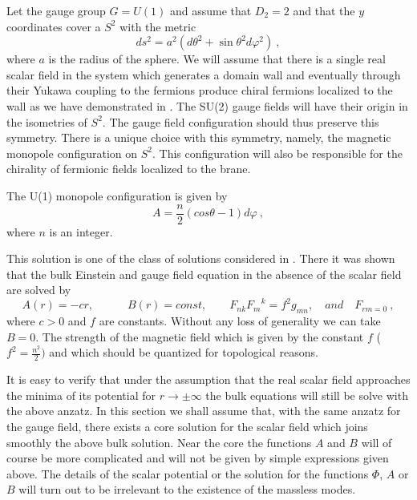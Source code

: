 \documentclass[a4paper,12pt]{article}
\begin{document}
Let the gauge group $G=U(1)$ and assume that $D_2=2$ and that the $y$
coordinates cover a $S^2$ with the metric
\begin{equation}
ds^2 = a^2 (d\theta^2  + \sin\theta ^2 d\varphi^2)~,
\end{equation}
where $a$ is the radius of the sphere.  We will assume that there is
a single real scalar field in the system which generates a domain
wall and eventually through their Yukawa coupling to the fermions
produce chiral fermions localized to the wall as we have demonstrated
in \cite{Randjbar-Daemi:2000cr}. The SU(2) gauge fields will have
their origin in the isometries of $S^2$. The gauge field
configuration should thus preserve this symmetry. There is a unique
choice with this symmetry, namely, the magnetic monopole
configuration on $S^2$. This configuration will also be responsible
for the chirality of fermionic fields localized to the brane.

The U(1) monopole configuration is given by
\begin{equation}
 A= \frac{n}{2}(cos\theta -1)d\varphi~,
\end{equation}
where $n$ is an integer.

This solution is one of the class of solutions considered in
\cite{Randjbar-Daemi:2000ft}. There it was shown that the bulk
Einstein and gauge field equation in the absence of the scalar field
are solved by
\begin{equation}
A(r) = -cr, \quad \quad\quad  B(r)=const, \quad\quad F_{nk}F_m^{\quad
k}= f^2 g_{mn}, \quad and\quad  F_{rm=0}~,
\end{equation}
where $c>0$ and $f$ are constants.  Without any loss of generality we
can take $B=0$. The strength of the magnetic field which is given by
the constant $f$  ( $f^2 = \frac{n^2}{2})$ and which should be
quantized for topological reasons.

It is easy to verify that under the assumption that the  real scalar
field approaches the minima of its potential for $r\rightarrow
\pm\infty$ the bulk equations will still  be solve with the above
anzatz.  In this section we shall assume that, with the same anzatz
for the gauge field,  there exists a core solution for the scalar
field which joins smoothly the above bulk solution.  Near the core
the functions $A$ and $B$ will of course be more complicated and will
not be given by simple expressions given above. The details of the
scalar potential or the solution for the functions $\Phi$, $A$ or $B$
will turn out to be irrelevant to the existence of the massless
modes.
\end{document}
